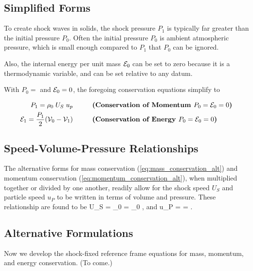 \subsection{Simplified Forms}
To create shock waves in solids, the shock pressure $P_1$ is 
typically far greater than the initial pressure $P_0$.  
Often the initial pressure $P_0$ is ambient atmospheric pressure, 
which is small enough compared to $P_1$ that $P_0$ can be ignored.

Also, the internal energy per unit mass $\mathcal{E}_0$ can be set 
to zero because it is a thermodynamic variable, and can be set
relative to any datum.  

With $P_0 = $ and $\mathcal{E}_0 = 0$, the foregoing conservation 
equations simplify to

\begin{align}
P_1 = \rho_0 \; U_S \; u_p 
& \hspace{1cm} {\mbox{\bf (Conservation of Momentum $P_0 = \mathcal{E}_0 = 0$)}} \\
\mathcal{E}_1 = \frac{P_1}{2} (\mathcal{V}_0 - \mathcal{V}_1) 
& \hspace{1cm} {\mbox{\bf (Conservation of Energy $P_0 = \mathcal{E}_0 = 0$)}}
\end{align}


\subsection{Speed-Volume-Pressure Relationships}
The alternative forms for mass conservation (\ref{eq:mass_conservation_alt})
and momentum conservation (\ref{eq:momentum_conservation_alt}), 
when multiplied together or divided by one another, readily 
allow for the shock speed $U_S$ and particle speed $u_P$ to be written 
in terms of volume and pressure.  These relationship are found to be
\be
 U_S = \svol_0  
     = \svol_0 ,
	 \label{eq:shock_PV}
\ee
and
\be
 u_P =  = 
 .
 \label{eq:particle_PV}
\ee


\subsection{Alternative Formulations}
Now we develop the {shock-fixed reference frame} equations for mass, 
momentum, and energy conservation. (To come.)


